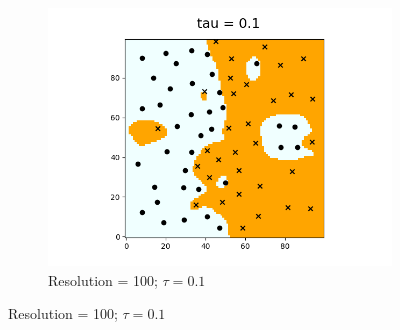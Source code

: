 \documentclass{article}
\begin{document}
\begin{figure}[!htb]
\begin{subfigure}{0.3\textwidth}
      \centering
      \includegraphics[width=\linewidth]{res_100_tau_0point1}
      \caption{Resolution = 100; \(\tau = 0.1\) }
      \label{fig:subfig6}
    \end{subfigure}

    \vspace{1cm}


\end{figure}
\end{document}
